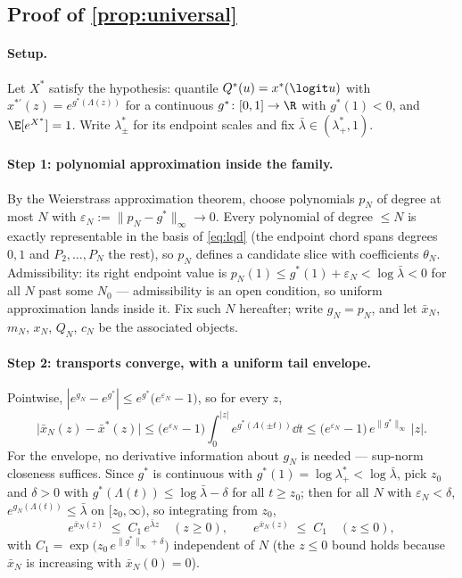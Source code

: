 \subsection{Proof of \texorpdfstring{\cref{prop:universal}}{the universality proposition}}
\label{app:universalproof}

\paragraph{Setup.}
Let $X^{\ast}$ satisfy the hypothesis: quantile
$Q^{\ast}(u)=x^{\ast}(\logit u)$ with
$x^{\ast\prime}(z)=e^{g^{\ast}(\Lambda(z))}$ for a continuous
$g^{\ast}\colon[0,1]\to\R$ with $g^{\ast}(1)<0$, and $\E[e^{X^{\ast}}]=1$.
Write $\lambda_\pm^{\ast}$ for its endpoint scales and fix
$\bar\lambda\in(\lambda_+^{\ast},1)$.

\paragraph{Step 1: polynomial approximation inside the family.}
By the Weierstrass approximation theorem, choose polynomials $p_N$ of
degree at most $N$ with
$\varepsilon_N:=\|p_N-g^{\ast}\|_{\infty}\to0$.  Every polynomial of
degree $\le N$ is exactly representable in the basis of \eqref{eq:lqd}
(the endpoint chord spans degrees $0,1$ and $P_2,\dots,P_N$ the rest),
so $p_N$ defines a candidate slice with coefficients $\theta_N$.
Admissibility: its right endpoint value is
$p_N(1)\le g^{\ast}(1)+\varepsilon_N<\log\bar\lambda<0$ for all $N$ past
some $N_0$ --- admissibility is an open condition, so uniform
approximation lands inside it.  Fix such $N$ hereafter; write $g_N=p_N$,
and let $\bar{x}_N$, $m_N$, $x_N$, $Q_N$, $c_N$ be the associated
objects.

\paragraph{Step 2: transports converge, with a uniform tail envelope.}
Pointwise, $|e^{g_N}-e^{g^{\ast}}|\le
e^{g^{\ast}}\big(e^{\varepsilon_N}-1\big)$, so for every $z$,
\[
\big|\bar{x}_N(z)-\bar{x}^{\ast}(z)\big|
\le\big(e^{\varepsilon_N}-1\big)\int_{0}^{|z|}
e^{g^{\ast}(\Lambda(\pm t))}\dd t
\le\big(e^{\varepsilon_N}-1\big)\,e^{\|g^{\ast}\|_\infty}\,|z| .
\]
For the envelope, no derivative information about $g_N$ is needed ---
sup-norm closeness suffices.  Since $g^{\ast}$ is continuous with
$g^{\ast}(1)=\log\lambda_+^{\ast}<\log\bar\lambda$, pick $z_0$ and
$\delta>0$ with $g^{\ast}(\Lambda(t))\le\log\bar\lambda-\delta$ for all
$t\ge z_0$; then for all $N$ with $\varepsilon_N<\delta$,
$e^{g_N(\Lambda(t))}\le\bar\lambda$ on $[z_0,\infty)$, so integrating
from $z_0$,
\begin{equation}
e^{\bar{x}_N(z)}\;\le\;C_1\,e^{\bar\lambda z}\quad(z\ge0),
\qquad
e^{\bar{x}_N(z)}\;\le\;C_1\quad(z\le0),
\label{eq:envelopeB}
\end{equation}
with $C_1=\exp\big(z_0\,e^{\|g^{\ast}\|_\infty+\delta}\big)$
independent of $N$ (the $z\le0$ bound holds because $\bar{x}_N$ is
increasing with $\bar{x}_N(0)=0$).

